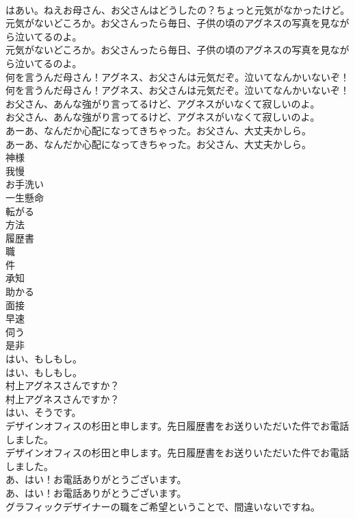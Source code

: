 \documentclass[8pt]{extreport}
\begin{document}
\begin{CJK}{UTF8}{min}
\\	はあい。ねえお母さん、お父さんはどうしたの？ちょっと元気がなかったけど。 
\\	元気がないどころか。お父さんったら毎日、子供の頃のアグネスの写真を見ながら泣いてるのよ。	
\\	元気がないどころか。お父さんったら毎日、子供の頃のアグネスの写真を見ながら泣いてるのよ。 
\\	何を言うんだ母さん！アグネス、お父さんは元気だぞ。泣いてなんかいないぞ！	
\\	何を言うんだ母さん！アグネス、お父さんは元気だぞ。泣いてなんかいないぞ！ 
\\	お父さん、あんな強がり言ってるけど、アグネスがいなくて寂しいのよ。	
\\	お父さん、あんな強がり言ってるけど、アグネスがいなくて寂しいのよ。 
\\	あーあ、なんだか心配になってきちゃった。お父さん、大丈夫かしら。	
\\	あーあ、なんだか心配になってきちゃった。お父さん、大丈夫かしら。 
\\	神様
\\	我慢
\\	お手洗い
\\	一生懸命
\\	転がる
\\	方法
\\	履歴書
\\	職
\\	件
\\	承知
\\	助かる
\\	面接
\\	早速
\\	伺う
\\	是非
\\	はい、もしもし。	
\\	はい、もしもし。 
\\	村上アグネスさんですか？	
\\	村上アグネスさんですか？ 
\\	はい、そうです。 
\\	デザインオフィスの杉田と申します。先日履歴書をお送りいただいた件でお電話しました。	
\\	デザインオフィスの杉田と申します。先日履歴書をお送りいただいた件でお電話しました。 
\\	あ、はい！お電話ありがとうございます。	
\\	あ、はい！お電話ありがとうございます。 
\\	グラフィックデザイナーの職をご希望ということで、間違いないですね。	

\end{CJK}
\end{document}
